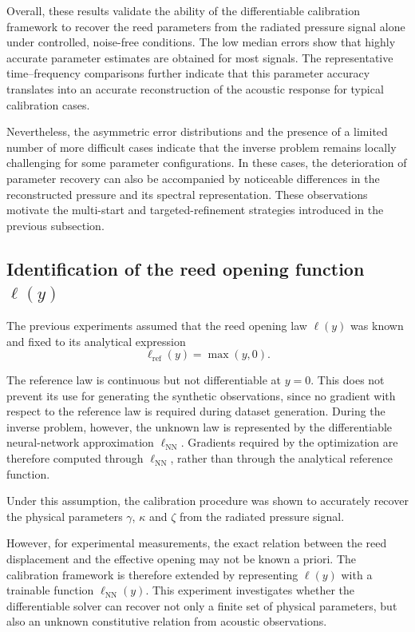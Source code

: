 \documentclass[11pt,a4paper]{report}
\theoremstyle{plain}
\theoremstyle{definition}
\begin{document}
Overall, these results validate the ability of the differentiable calibration
framework to recover the reed parameters from the radiated pressure signal
alone under controlled, noise-free conditions. The low median errors show that
highly accurate parameter estimates are obtained for most signals. The
representative time--frequency comparisons further indicate that this
parameter accuracy translates into an accurate reconstruction of the acoustic
response for typical calibration cases.

Nevertheless, the asymmetric error distributions and the presence of a
limited number of more difficult cases indicate that the inverse problem
remains locally challenging for some parameter configurations. In these cases,
the deterioration of parameter recovery can also be accompanied by noticeable
differences in the reconstructed pressure and its spectral representation.
These observations motivate the multi-start and targeted-refinement strategies
introduced in the previous subsection.

\subsection{Identification of the reed opening function $\ell(y)$}
\label{subsec:l_function_identification}

The previous experiments assumed that the reed opening law $\ell(y)$ was known
and fixed to its analytical expression
\begin{equation}
    \ell_{\mathrm{ref}}(y) = \max(y,0).
    \label{eq:l_reference}
\end{equation}

The reference law is continuous but not differentiable at $y=0$. This does
not prevent its use for generating the synthetic observations, since no
gradient with respect to the reference law is required during dataset
generation. During the inverse problem, however, the unknown law is represented
by the differentiable neural-network approximation $\ell_{\mathrm{NN}}$.
Gradients required by the optimization are therefore computed through
$\ell_{\mathrm{NN}}$, rather than through the analytical reference function.


Under this assumption, the calibration procedure was shown to accurately
recover the physical parameters $\gamma$, $\kappa$ and $\zeta$ from the
radiated pressure signal.

However, for experimental measurements, the exact relation between the reed
displacement and the effective opening may not be known a priori. The
calibration framework is therefore extended by representing $\ell(y)$ with a
trainable function $\ell_{\mathrm{NN}}(y)$. This experiment investigates
whether the differentiable solver can recover not only a finite set of
physical parameters, but also an unknown constitutive relation from acoustic
observations.
\end{document}
